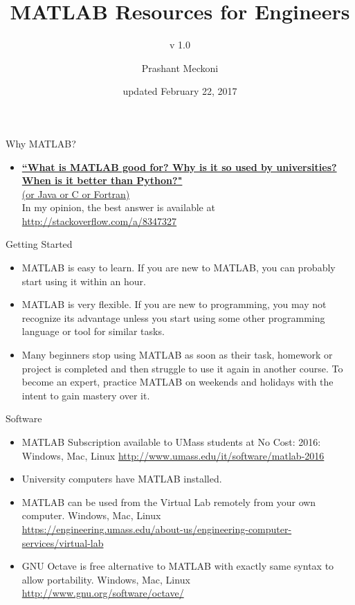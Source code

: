 \documentclass[10pt]{beamer}
\author[Prashant Meckoni]{Prashant Meckoni}
\title[MATLAB Resources]{MATLAB Resources for Engineers}
\subtitle[v 1.0]{v 1.0}
\institute[UMass Amherst]{Mechanical \& Industrial Engineering, \\University of Massachusetts, Amherst }
\date{updated February 22, 2017}
\begin{document}
\begin{frame}
\titlepage
\end{frame}
\begin{frame}{Why MATLAB?}
\begin{itemize}
\item \href{http://stackoverflow.com/q/179904}{\textbf{``What is MATLAB good for? Why is it so used by universities? When is it better than Python?"} \\(or Java or C or Fortran)}\\ 
In my opinion, the best answer is available at\\ \url{http://stackoverflow.com/a/8347327}
\end{itemize}
\end{frame}
\begin{frame}{Getting Started}
\begin{itemize}
\item MATLAB is easy to learn. If you are new to MATLAB, you can probably start using it within an hour.
\item MATLAB is very flexible. If you are new to programming, you may not recognize its advantage unless you start using some other programming language or tool for similar tasks.
\item Many beginners stop using MATLAB as soon as their task, homework or project is completed and then struggle to use it again in another course. To become an expert, practice MATLAB on weekends and holidays with the intent to gain mastery over it.
\end{itemize}
\end{frame}
\begin{frame}{Software}
\begin{itemize}
        \item MATLAB Subscription available to UMass students at No Cost: 2016: Windows, Mac, Linux \url{http://www.umass.edu/it/software/matlab-2016}
\item University computers have MATLAB installed.
\item MATLAB can be used from the Virtual Lab remotely from your own computer. Windows, Mac, Linux\\ \url{https://engineering.umass.edu/about-us/engineering-computer-services/virtual-lab}
\item GNU Octave is free alternative to MATLAB with exactly same syntax to allow portability. Windows, Mac, Linux \url{http://www.gnu.org/software/octave/} 
\end{itemize}
\end{frame}
\end{document}
